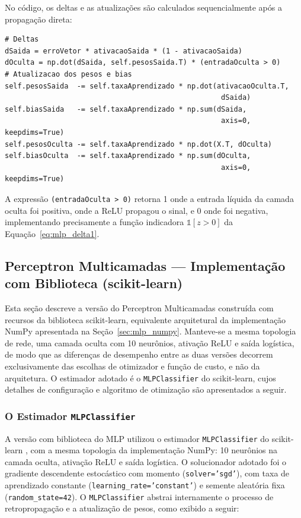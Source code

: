 No código, os deltas e as atualizações são calculados sequencialmente após a propagação direta:

\begin{lstlisting}[caption={Retropropagação e atualização de parâmetros no MLP NumPy.}, label={lst:mlp_backprop}]
# Deltas
dSaida = erroVetor * ativacaoSaida * (1 - ativacaoSaida)
dOculta = np.dot(dSaida, self.pesosSaida.T) * (entradaOculta > 0)
# Atualizacao dos pesos e bias
self.pesosSaida  -= self.taxaAprendizado * np.dot(ativacaoOculta.T,
                                                   dSaida)
self.biasSaida   -= self.taxaAprendizado * np.sum(dSaida,
                                                   axis=0, keepdims=True)
self.pesosOculta -= self.taxaAprendizado * np.dot(X.T, dOculta)
self.biasOculta  -= self.taxaAprendizado * np.sum(dOculta,
                                                   axis=0, keepdims=True)
\end{lstlisting}

A expressão \texttt{(entradaOculta > 0)} retorna 1 onde a entrada líquida da camada oculta foi positiva, onde a ReLU propagou o sinal, e 0 onde foi negativa, implementando precisamente a função indicadora $\mathbb{1}[z > 0]$ da Equação~\eqref{eq:mlp_delta1}.

\subsection{Perceptron Multicamadas --- Implementação com Biblioteca (scikit-learn)}
\label{sec:mlp_sklearn}

Esta seção descreve a versão do Perceptron Multicamadas construída com recursos da biblioteca scikit-learn, equivalente arquitetural da implementação NumPy apresentada na Seção~\ref{sec:mlp_numpy}. Manteve-se a mesma topologia de rede, uma camada oculta com 10 neurônios, ativação ReLU e saída logística, de modo que as diferenças de desempenho entre as duas versões decorrem exclusivamente das escolhas de otimizador e função de custo, e não da arquitetura. O estimador adotado é o \texttt{MLPClassifier} do scikit-learn, cujos detalhes de configuração e algoritmo de otimização são apresentados a seguir.

\subsubsection{O Estimador \texttt{MLPClassifier}}

{\sloppy
A versão com biblioteca do MLP utilizou o estimador \texttt{MLPClassifier} do scikit-learn \cite{pedregosa2011}, com a mesma topologia da implementação NumPy: 10 neurônios na camada oculta, ativação ReLU e saída logística. O solucionador adotado foi o gradiente descendente estocástico com momento (\texttt{solver='sgd'}), com taxa de aprendizado constante (\texttt{learning\_rate='constant'}) e semente aleatória fixa (\texttt{random\_state=42}). O \texttt{MLPClassifier} abstrai internamente o processo de retropropagação e a atualização de pesos, como exibido a seguir:
\par}

